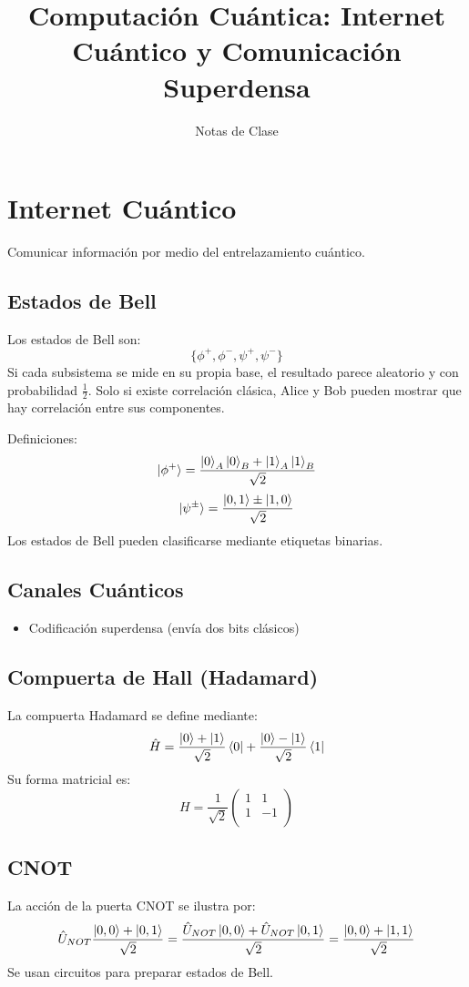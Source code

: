 \documentclass[a4paper,12pt]{article}
\title{Computación Cuántica: Internet Cuántico y Comunicación Superdensa}
\author{Notas de Clase}
\date{}
\begin{document}
\maketitle

\section{Internet Cuántico}

Comunicar información por medio del entrelazamiento cuántico.

\subsection{Estados de Bell}
Los estados de Bell son:
\[
\{\phi^{+},\phi^{-},\psi^{+},\psi^{-}\}
\]
Si cada subsistema se mide en su propia base, el resultado parece aleatorio y con probabilidad $\frac{1}{2}$. Solo si existe correlación clásica, Alice y Bob pueden mostrar que hay correlación entre sus componentes.

Definiciones:
\[
\ket{\phi^+} = \frac{\ket{0}_A\ket{0}_B + \ket{1}_A\ket{1}_B}{\sqrt{2}}
\]
\[
\ket{\psi^\pm} = \frac{\ket{0,1} \pm \ket{1,0}}{\sqrt{2}}
\]
Los estados de Bell pueden clasificarse mediante etiquetas binarias.

\subsection{Canales Cuánticos}
\begin{itemize}
    \item Codificación superdensa (envía dos bits clásicos)
\end{itemize}

\subsection{Compuerta de Hall (Hadamard)}
La compuerta Hadamard se define mediante:
\[
\hat{H} = \frac{\ket{0}+\ket{1}}{\sqrt{2}}\bra{0} + \frac{\ket{0}-\ket{1}}{\sqrt{2}}\bra{1}
\]
Su forma matricial es:
\[
H = \frac{1}{\sqrt{2}}
\begin{pmatrix}
1 & 1 \\
1 & -1 \\
\end{pmatrix}
\]

\subsection{CNOT}
La acción de la puerta CNOT se ilustra por:
\[
\hat{U}_{NOT}\frac{\ket{0,0}+\ket{0,1}}{\sqrt{2}} = \frac{\hat{U}_{NOT}\ket{0,0}+\hat{U}_{NOT}\ket{0,1}}{\sqrt{2}} = \frac{\ket{0,0}+\ket{1,1}}{\sqrt{2}}
\]
Se usan circuitos para preparar estados de Bell.
\end{document}
